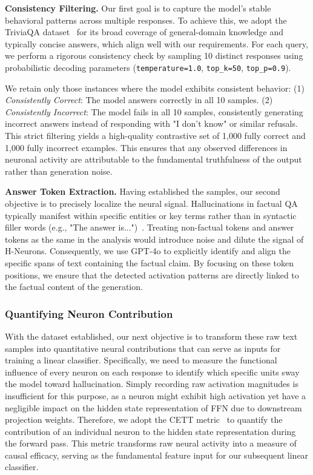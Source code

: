 \documentclass[dvipsnames]{article}
\begin{document}
\textbf{Consistency Filtering.}\quad
Our first goal is to capture the model's stable behavioral patterns across multiple responses.
To achieve this, we adopt the TriviaQA dataset~\citep{Triviaqa} for its broad coverage of general-domain knowledge and typically concise answers, which align well with our requirements. For each query, we perform a rigorous consistency check by sampling 10 distinct responses using probabilistic decoding parameters (\texttt{temperature=1.0}, \texttt{top\_k=50}, \texttt{top\_p=0.9}).

We retain only those instances where the model exhibits consistent behavior:
(1) \textit{Consistently Correct}: The model answers correctly in all 10 samples.
(2) \textit{Consistently Incorrect}: The model fails in all 10 samples, consistently generating incorrect answers instead of responding with "I don't know" or similar refusals.
This strict filtering yields a high-quality contrastive set of 1,000 fully correct and 1,000 fully incorrect examples. This ensures that any observed differences in neuronal activity are attributable to the fundamental truthfulness of the output rather than generation noise.

\textbf{Answer Token Extraction.}\quad
Having established the samples, our second objective is to precisely localize the neural signal. Hallucinations in factual QA typically manifest within specific entities or key terms rather than in syntactic filler words (e.g., "The answer is...")~\citep{LLMsKnowMore}. Treating non-factual tokens and answer tokens as the same in the analysis would introduce noise and dilute the signal of H-Neurons.
Consequently, we use GPT-4o to explicitly identify and align the specific spans of text containing the factual claim. By focusing on these token positions, we ensure that the detected activation patterns are directly linked to the factual content of the generation.


\subsubsection{Quantifying Neuron Contribution}
With the dataset established, our next objective is to transform these raw text samples into quantitative neural contributions that can serve as inputs for training a linear classifier. Specifically, we need to measure the functional influence of every neuron on each response to identify which specific units sway the model toward hallucination. Simply recording raw activation magnitudes is insufficient for this purpose, as a neuron might exhibit high activation yet have a negligible impact on the hidden state representation of FFN due to downstream projection weights. Therefore, we adopt the CETT metric~\citep{relu2wins} to quantify the contribution of an individual neuron to the hidden state representation during the forward pass. This metric transforms raw neural activity into a measure of causal efficacy, serving as the fundamental feature input for our subsequent linear classifier.
\end{document}
